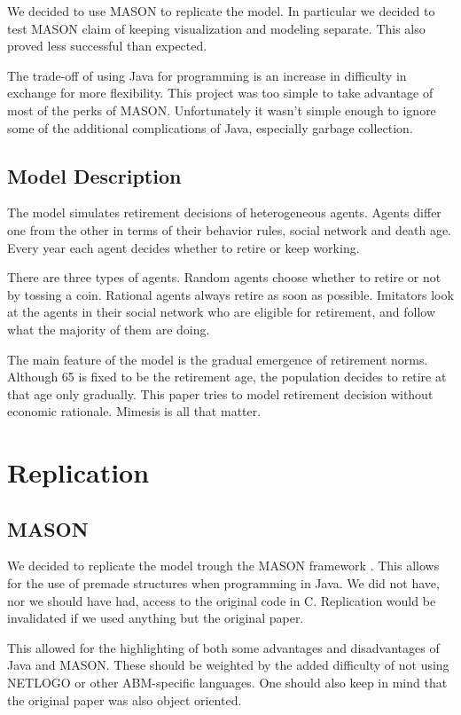 \documentclass[runningheads,a4paper]{article}
\begin{document}
We decided to use MASON to replicate the model.
In particular we decided to test MASON claim of keeping visualization and modeling separate.
This also proved less successful than expected.

The trade-off of using Java for programming is an increase in difficulty in exchange for more flexibility.
This project was too simple to take advantage of most of the perks of MASON.
Unfortunately it wasn't simple enough to ignore some of the additional complications of Java, especially garbage collection.

\subsection{Model Description}

The model simulates retirement decisions of heterogeneous agents.
Agents differ one from the other in terms of their behavior rules, social network and death age.
Every year each agent decides whether to retire or keep working. 

There are three types of agents.
Random agents choose whether to retire or not by tossing a coin.
Rational agents always retire as soon as possible.
Imitators look at the agents in their social network who are eligible for retirement, and follow what the majority of them are doing.

The main feature of the model is the gradual emergence of retirement norms.
Although 65 is fixed to be the retirement age, the population decides to retire at that age only gradually.
This paper tries to model retirement decision without economic rationale.
Mimesis is all that matter.

\section{Replication}

\subsection{MASON}
We decided to replicate the model trough the MASON framework \cite{luke2005mason}.
This allows for the use of premade structures when programming in Java.
We did not have, nor we should have had, access to the original code in C.
Replication would be invalidated if we used anything but the original paper.

This allowed for the highlighting of both some advantages and disadvantages of Java and MASON.
These should be weighted by the added difficulty of not using NETLOGO or other ABM-specific languages.
One should also keep in mind that the original paper was also object oriented.
\end{document}
